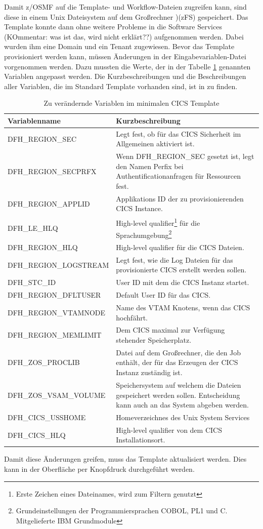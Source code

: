 Damit z/OSMF auf die Template- und Workflow-Dateien zugreifen kann, sind diese in einem Unix Dateisystem auf dem Großrechner )(zFS) gespeichert.
Das Template konnte dann ohne weitere Probleme in die Software Services (KOmmentar: was ist das, wird nicht erklärt??)  aufgenommen werden.
Dabei wurden ihm eine Domain und ein Tenant zugewiesen.
Bevor das Template provisioniert werden kann, müssen Änderungen in der Eingabevariablen-Datei vorgenommen werden.
Dazu mussten die Werte, der in der Tabelle \ref{tab:cgsvars} genannten Variablen angepasst werden.
Die Kurzbeschreibungen und die Beschreibungen aller Variablen, die im Standard Template vorhanden sind, ist in \cite{IBM.2019} zu finden.
\begin{table}
\centering
\begin{tabularx}{\textwidth}{X|X}
Variablenname & Kurzbeschreibung \\
\hline
DFH\_REGION\_SEC & Legt fest, ob für das CICS Sicherheit im Allgemeinen aktiviert ist. \\
\hline
DFH\_REGION\_SECPRFX & Wenn DFH\_REGION\_SEC gesetzt ist, legt den Namen Perfix bei Authentificationanfragen für Ressourcen fest. \\
\hline
DFH\_REGION\_APPLID & Applikations ID der zu provisionierenden CICS Instance. \\
\hline
DFH\_LE\_HLQ & High-level qualifier\footnote{Erste Zeichen eines Dateinames, wird zum Filtern genutzt} für die Sprachumgebung\footnote{Grundeinstellungen der Programmiersprachen COBOL, PL1 und C. Mitgelieferte IBM Grundmodule} \\
\hline
DFH\_REGION\_HLQ & High-level qualifier für die CICS Dateien.\\
\hline
DFH\_REGION\_LOGSTREAM & Legt fest, wie die Log Dateien für das provisionierte CICS erstellt werden sollen. \\
\hline
DFH\_STC\_ID & User ID mit dem die CICS Instanz startet. \\
\hline
DFH\_REGION\_DFLTUSER & Default User ID für das CICS. \\
\hline
DFH\_REGION\_VTAMNODE & Name des VTAM Knotens, wenn das CICS hochfährt. \\
\hline
DFH\_REGION\_MEMLIMIT & Dem CICS maximal zur Verfügung stehender Speicherplatz. \\
\hline
DFH\_ZOS\_PROCLIB & Datei auf dem Großrechner, die den Job enthält, der für das Erzeugen der CICS Instanz zuständig ist. \\
\hline
DFH\_ZOS\_VSAM\_VOLUME & Speichersystem auf welchem die Dateien gespeichert werden sollen. Entscheidung kann auch an das System abgeben werden. \\
\hline
DFH\_CICS\_USSHOME & Homeverzeichnes des Unix System Services \\
\hline
DFH\_CICS\_HLQ & High-level qualifier von dem CICS Installationsort. \\
\end{tabularx}
\caption{Zu verändernde Variablen im minimalen CICS Template}
\label{tab:cgsvars}
\end{table}
Damit diese Änderungen greifen, muss das Template aktualisiert werden.
Dies kann in der Oberfläche per Knopfdruck durchgeführt werden.

